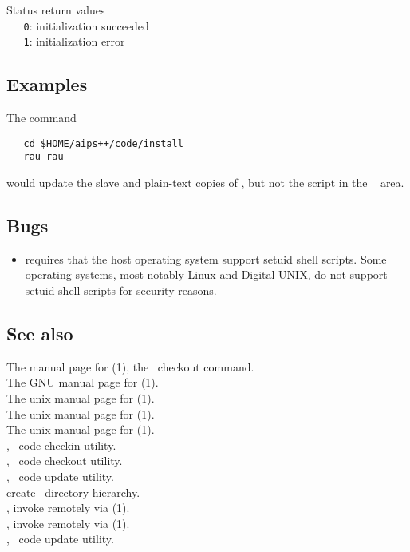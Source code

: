 Status return values
\\ \verb+   0+:  initialization succeeded
\\ \verb+   1+:  initialization error
 
\subsection*{Examples}
 
The command
 
\begin{verbatim}
   cd $HOME/aips++/code/install
   rau rau
\end{verbatim}
 
\noindent
would update the slave and plain-text copies of , but not the script
in the \aipspp\  area.

\subsection*{Bugs}
\begin{itemize}
\item
    requires that the host operating system support setuid
   shell scripts.  Some operating systems, most notably Linux and
   Digital UNIX, do not support setuid shell scripts for security
   reasons.
\end{itemize}

\subsection*{See also}

The manual page for (1), the \rcs\ checkout command.\\
The GNU manual page for (1).\\
The unix manual page for (1).\\
The unix manual page for (1).\\
The unix manual page for (1).\\
, \aipspp\ code checkin utility.\\
, \aipspp\ code checkout utility.\\
, \aipspp\ code update utility.\\
 create \aipspp\ directory hierarchy.\\
, invoke  remotely via (1).\\
, invoke  remotely via (1).\\
, \aipspp\ code update utility.
 
